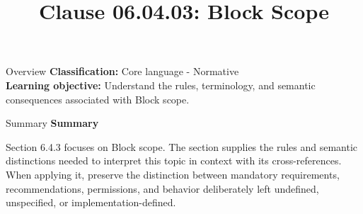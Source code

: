 \documentclass[10pt,letterpaper]{article}
\title{Clause 06.04.03: Block Scope}
\author{}
\date{}
\begin{document}
\maketitle
\begin{CornellOverviewBox}{Overview}
\textbf{Classification:} Core language - Normative\\[2pt]
\textbf{Learning objective:} Understand the rules, terminology, and semantic consequences associated with Block scope.
\end{CornellOverviewBox}\begin{CornellSummaryBox}{Summary}
{\sffamily\bfseries\color{Accent} Summary}\par\vspace{3pt}Section 6.4.3 focuses on Block scope. The section supplies the rules and semantic distinctions needed to interpret this topic in context with its cross-references. When applying it, preserve the distinction between mandatory requirements, recommendations, permissions, and behavior deliberately left undefined, unspecified, or implementation-defined.
\end{CornellSummaryBox}
\end{document}
